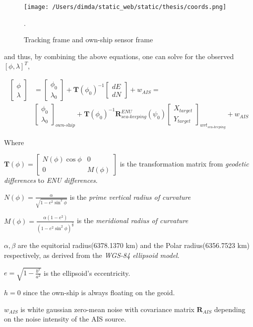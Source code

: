 \begin{figure}[H]
	\centering
	\texttt{[image: /Users/dimda/static\_web/static/thesis/coords.png]}
	\caption{Tracking frame and own-ship sensor frame}.
	\label{fig:track_vs_own_ship}
\end{figure}



and thus, by combining the above equations, one can solve for the observed $[\phi, \lambda]^{T}$,

\begin{equation}
\begin{aligned}
\begin{bmatrix}
\phi\\ \lambda
\end{bmatrix}&=
\begin{bmatrix}
\phi_{0}\\ \lambda_{0}
\end{bmatrix} + {\mathbf{T}(\phi_{0})}^{-1}\begin{bmatrix}
dE\\ dN
\end{bmatrix} + w_{\textit{AIS}}=  \\
&\begin{bmatrix}
\phi_{0}\\ \lambda_{0}
\end{bmatrix}_{\textit{own-ship}} + \mathbf{T}(\phi_{0})^{-1}
\mathbf{R}^{\textit{ENU}}_{\textit{sea-keeping}}(\psi_{\textit{0}})
\begin{bmatrix}
X_{\textit{target}}\\ Y_{\textit{target}}
\end{bmatrix}_{\textit{wrt}_{{\textit{sea-keeping}}}}+w_{\textit{AIS}}
\end{aligned}
\end{equation}


Where

\begin{description}
	\item $\mathbf{T}(\phi)=
	\begin{bmatrix}
	N(\phi)\cos\phi &0\\
	0 &M(\phi)
	\end{bmatrix}
	$ is the transformation matrix from \emph{geodetic differences} to \emph{ENU differences}.
	\item $N(\phi) = \frac{\alpha}{\sqrt{1-e^2\sin^2\phi}}$ is the \emph{prime vertical radius of curvature}
	\item $M(\phi) = \frac{\alpha(1-e^2)}{(1-e^2\sin^2\phi)^\frac{3}{2}}$ is the \emph{meridional radius of curvature}
	\item $\alpha,\beta$ are the equitorial radius(6378.1370 km) and the Polar radius(6356.7523 km) respectively, as derived from the \emph{WGS-84 ellipsoid model}.
	\item $e = \sqrt{1 -\frac{b^2}{a^2}}$ is the ellipsoid's eccentricity.
	\item $h = 0 $ since the own-ship is always floating on the geoid.
	\item $w_{\textit{AIS}}$ is white gaussian zero-mean noise with covariance matrix $\mathbf{R}_{\textit{AIS}}$ depending on the noise intensity of the AIS source.
\end{description}

